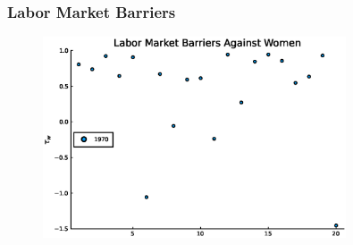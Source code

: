 \documentclass[11pt]{beamer}
\begin{document}

\begin{frame}
	\frametitle{Labor Market Barriers}
	\label{barriers}
	\begin{figure}
		\begin{center}
			\includegraphics[width=0.8\textwidth]{plots/tau_w_women_70.eps}
			\label{ }
		\end{center}
	\end{figure}
	\hyperlink{occupations}{}
\end{frame}
\end{document}
